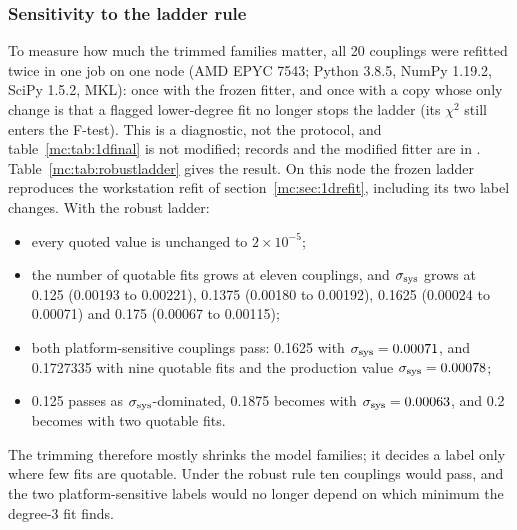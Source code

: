 \subsubsection{Sensitivity to the ladder rule}\label{mc:sec:robustladder}
To measure how much the trimmed families matter, all 20 couplings were refitted twice in one job on one node (AMD EPYC 7543; Python 3.8.5,
NumPy 1.19.2, SciPy 1.5.2, MKL): once with the frozen fitter, and once with a copy whose only change is that a flagged lower-degree fit no
longer stops the ladder (its $\chi^2$ still enters the F-test). This is a diagnostic, not the protocol, and table~\ref{mc:tab:1dfinal} is not
modified; records and the modified fitter are in . Table~\ref{mc:tab:robustladder} gives the result.
On this node the frozen ladder reproduces the workstation refit of section~\ref{mc:sec:1drefit}, including its two label changes. With the
robust ladder:
\begin{itemize}
\item every quoted value is unchanged to $2\times10^{-5}$;
\item the number of quotable fits grows at eleven couplings, and $\sigma_{\rm sys}$ grows at 0.125 (0.00193 to 0.00221), 0.1375 (0.00180 to 0.00192), 0.1625
 (0.00024 to 0.00071) and 0.175 (0.00067 to 0.00115);
\item both platform-sensitive couplings pass: 0.1625 with $\sigma_{\rm sys}=0.00071$, and 0.1727335 with nine quotable fits and the production value
 $\sigma_{\rm sys}=0.00078$;
\item 0.125 passes as $\sigma_{\rm sys}$-dominated, 0.1875 becomes  with $\sigma_{\rm sys}=0.00063$, and 0.2 becomes 
 with two quotable fits.
\end{itemize}
The trimming therefore mostly shrinks the model families; it decides a label only where few fits are quotable. Under the robust rule ten
couplings would pass, and the two platform-sensitive labels would no longer depend on which minimum the degree-3 fit finds.
